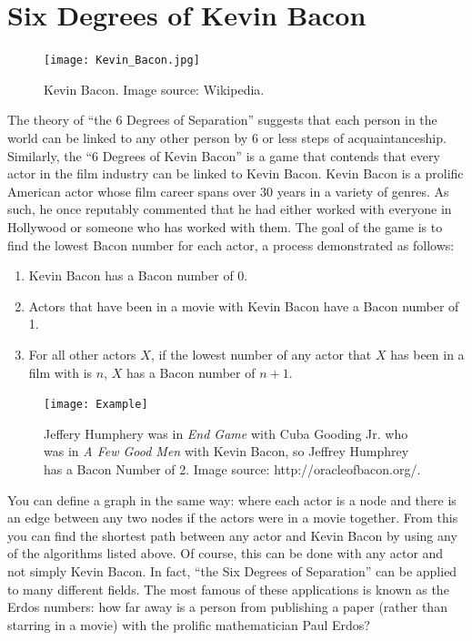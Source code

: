 \section*{Six Degrees of Kevin Bacon}
\begin{figure}[h]
\texttt{[image: Kevin\_Bacon.jpg]}
\caption{Kevin Bacon.  Image source: Wikipedia.}
\end{figure}

The theory of ``the 6 Degrees of Separation'' suggests that each person in the world can be linked to any other person by 6 or less steps of acquaintanceship.
Similarly, the ``6 Degrees of Kevin Bacon'' is a game that contends that every actor in the film industry can be linked to Kevin Bacon. Kevin Bacon is a prolific American actor whose film career spans over 30 years in a variety of genres. As such, he once reputably commented that he had either worked with everyone in Hollywood or someone who has worked with them. The goal of the game is to find the lowest Bacon number for each actor, a process demonstrated as follows:
\begin{enumerate}
\item Kevin Bacon has a Bacon number of 0.
\item Actors that have been in a movie with Kevin Bacon have a Bacon number of 1.
\item For all other actors $X$, if the lowest number of any actor that $X$ has been in a film with is $n$, $X$ has a Bacon number of $n+1$.
\end{enumerate}

\begin{figure}[h]
\texttt{[image: Example]}
\caption{Jeffery Humphery was in \emph{End Game} with Cuba Gooding Jr. who was in \emph{A Few Good Men} with Kevin Bacon, so Jeffrey Humphrey has a Bacon Number of 2.  Image source: http://oracleofbacon.org/.}
\end{figure}

You can define a graph in the same way: where each actor is a node and there is an edge between any two nodes if the actors were in a movie together. From this you can find the shortest path between any actor and Kevin Bacon by using any of the algorithms listed above. Of course, this can be done with any actor and not simply Kevin Bacon. In fact, ``the Six Degrees of Separation'' can be applied to many different fields. The most famous of these applications is known as the Erdos numbers: how far away is a person from publishing a paper (rather than starring in a movie) with the prolific mathematician Paul Erdos?

